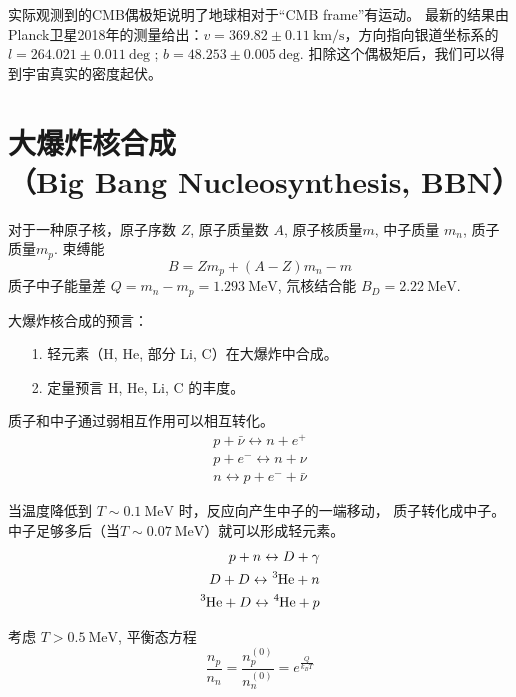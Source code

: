 \documentclass[12pt]{ctexart}
\begin{document}
实际观测到的CMB偶极矩说明了地球相对于“CMB frame”有运动。
最新的结果由Planck卫星2018年的测量给出：$v = 369.82 \pm 0.11 \mathrm{~km/s}$，方向指向银道坐标系的 $l = 264.021 \pm 0.011 \mathrm{~deg}$ ;  $b = 48.253 \pm 0.005 \mathrm{~deg}$.
扣除这个偶极矩后，我们可以得到宇宙真实的密度起伏。

\section{大爆炸核合成 \\（Big Bang Nucleosynthesis, BBN）}

对于一种原子核，原子序数 $Z$,
原子质量数 $A$, 原子核质量$m$, 中子质量 $m_n$, 质子质量$m_p$.
束缚能
\begin{equation}
    B=Z m_p + (A-Z) m_n -m
\end{equation}
质子中子能量差 $Q=m_n-m_p = 1.293 \mathrm{~MeV}$,
氘核结合能 $B_D = 2.22 \mathrm{~MeV} $.

大爆炸核合成的预言：
\begin{itemize}
    \item[1.] 轻元素（H, He, 部分 Li, C）在大爆炸中合成。
    \item[2.] 定量预言 H, He, Li, C 的丰度。
\end{itemize}

质子和中子通过弱相互作用可以相互转化。
\begin{eqnarray}
    p+\bar{\nu} \leftrightarrow n + e^+ \\ 
    p + e^- \leftrightarrow n + \nu \\ 
    n \leftrightarrow p + e^- + \bar{\nu}
\end{eqnarray}

当温度降低到 $T\sim 0.1 \mathrm{~MeV}$ 时，反应向产生中子的一端移动， 质子转化成中子。
中子足够多后（当$T\sim 0.07 \mathrm{~MeV}$）就可以形成轻元素。
\begin{eqnarray}
    p+n \leftrightarrow D + \gamma \\ 
    D + D \leftrightarrow \ce{^{3}He} + n \\ 
    \ce{^{3}He} + D \leftrightarrow \ce{^{4}He} + p  
\end{eqnarray}


考虑 $T > 0.5 \mathrm{~MeV}$,%
平衡态方程
\begin{equation}
    \frac{n_p}{n_n} = \frac{n_p^{(0)}}{n_n^{(0)}} = e^\frac{Q}{k_B T}
\end{equation}
\end{document}
